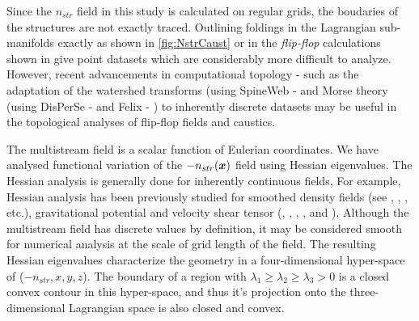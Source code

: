 \documentclass[fleqn,usenatbib,useAMS]{mnras}
\begin{document}
Since the $n_{str}$ field in this study is calculated on regular grids, the boudaries of the structures are not exactly traced. Outlining foldings in the Lagrangian sub-manifolds exactly as shown in \autoref{fig:NstrCaust} or in the {\it flip-flop} calculations shown in \cite{Shandarin2016} give point datasets which are considerably more difficult to analyze. However, recent advancements in computational topology - such as the adaptation of the watershed transforms (using SpineWeb -\citealt{Aragon-Calvo2008} and Morse theory (using DisPerSe - \citealt{Sousbie2011e} and Felix - \citealt{Shivshankar2015a}) to inherently discrete datasets may be useful in the topological analyses of flip-flop fields and caustics.


The multistream field is a scalar function of Eulerian coordinates. We have analysed functional variation of the $-n_{str}(\bmath{x})$ field using Hessian eigenvalues. The Hessian analysis is generally done for inherently continuous fields, For example, Hessian analysis has been previously studied for smoothed density fields (see \citealt{Sousbie2008a}, \citealt{Aragon-Calvo2007}, \citealt{Aragon-Calvo2010}, \citealt{Cautun2014a} etc.), gravitational potential and velocity shear tensor (\citealt{Hoffman2012a}, \citealt{Libeskind2013}, \citealt{Hahn2007}, \citealt{Forero-Romero2009a}, \citealt{Hoffman2012a} and \citealt{Cautun2014a}). Although the multistream field has discrete values by definition, it may be considered smooth for numerical analysis at the scale of grid length of the field. The resulting Hessian eigenvalues characterize the geometry in a four-dimensional hyper-space of ($-n_{str}, x, y, z$). The boundary of a region with $\lambda_1 \geq \lambda_2 \geq \lambda_3 > 0$ is a closed convex contour in this hyper-space, and thus it's projection onto the three-dimensional Lagrangian space is also closed and convex. 
\end{document}
